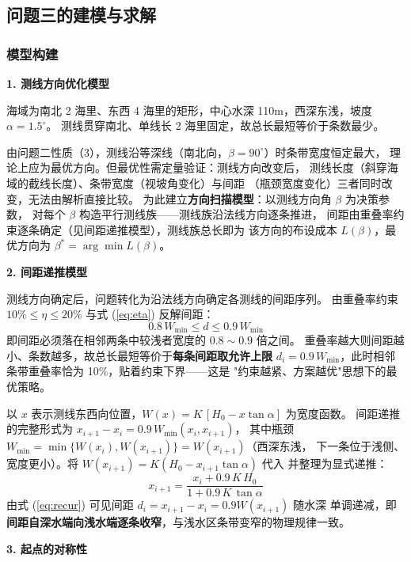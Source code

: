 \documentclass[withoutpreface,bwprint]{cumcmthesis} %
\begin{document}
\subsection{问题三的建模与求解}

\subsubsection{模型构建}

\textbf{1. 测线方向优化模型}

海域为南北 2 海里、东西 4 海里的矩形，中心水深 110m，西深东浅，坡度 $\alpha=1.5^\circ$。
测线贯穿南北、单线长 2 海里固定，故总长最短等价于条数最少。

由问题二性质（3），测线沿等深线（南北向，$\beta=90^\circ$）时条带宽度恒定最大，
理论上应为最优方向。但最优性需定量验证：测线方向改变后，
测线长度（斜穿海域的截线长度）、条带宽度（视坡角变化）与间距
（瓶颈宽度变化）三者同时改变，无法由解析直接比较。
为此建立\textbf{方向扫描模型}：以测线方向角 $\beta$ 为决策参数，
对每个 $\beta$ 构造平行测线族——测线族沿法线方向逐条推进，
间距由重叠率约束逐条确定（见间距递推模型），测线族总长即为
该方向的布设成本 $L(\beta)$，最优方向为 $\beta^*=\arg\min L(\beta)$。

\textbf{2. 间距递推模型}

测线方向确定后，问题转化为沿法线方向确定各测线的间距序列。
由重叠率约束 $10\%\le\eta\le20\%$ 与式 (\ref{eq:eta}) 反解间距：
\begin{equation}
    0.8\,W_{\min} \le d \le 0.9\,W_{\min}
\end{equation}
即间距必须落在相邻两条中较浅者宽度的 $0.8\sim0.9$ 倍之间。
重叠率越大则间距越小、条数越多，故总长最短等价于\textbf{每条间距取允许上限}
$d_i=0.9\,W_{\min}$，此时相邻条带重叠率恰为 10\%，贴着约束下界——这是
"约束越紧、方案越优"思想下的最优策略。

以 $x$ 表示测线东西向位置，$W(x)=K\,[H_0-x\tan\alpha]$ 为宽度函数。
间距递推的完整形式为 $x_{i+1}-x_i = 0.9\,W_{\min}(x_i, x_{i+1})$，
其中瓶颈 $W_{\min}=\min\{W(x_i),W(x_{i+1})\}=W(x_{i+1})$（西深东浅，
下一条位于浅侧、宽度更小）。将 $W(x_{i+1})=K(H_0-x_{i+1}\tan\alpha)$ 代入
并整理为显式递推：
\begin{equation}
    x_{i+1} = \frac{x_i + 0.9\,K\,H_0}{1 + 0.9\,K\,\tan\alpha}
    \label{eq:recur}
\end{equation}
由式 (\ref{eq:recur}) 可见间距 $d_i = x_{i+1}-x_i = 0.9W(x_{i+1})$ 随水深
单调递减，即\textbf{间距自深水端向浅水端逐条收窄}，与浅水区条带变窄的物理规律一致。

\textbf{3. 起点的对称性}
\end{document}

